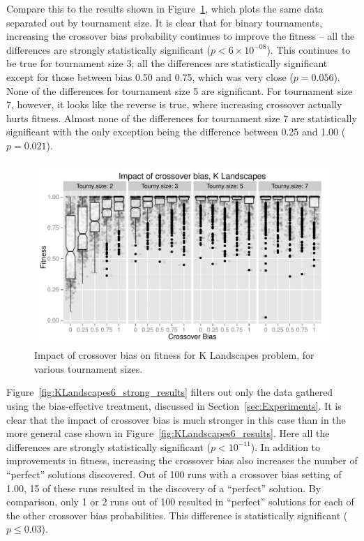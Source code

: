 \documentclass{sig-alternate}
\begin{document}
Compare this to the results shown in Figure~\ref{fig:KLandscapes6_XO_bias_impact_facets}, which plots the same data
separated out by tournament size. It is clear that for binary tournaments, increasing the crossover bias probability
continues to improve the fitness -- all the differences are strongly statistically significant ($p<6\times 10^{-08}$).
This continues to be true for tournament size 3; all the differences are statistically significant except for those
between bias 0.50 and 0.75, which was very close ($p=0.056$). None of the differences for tournament size 5 are
significant. For tournament size 7, however, it looks like the reverse is true, where increasing crossover actually
hurts fitness. Almost none of the differences for tournament size 7 are statistically significant with the only
exception being the difference between 0.25 and 1.00 ($p=0.021$).

\begin{figure}
\centering
\includegraphics[width=0.45 \textwidth]{Plots/KLandscapes6_XO_bias_impact_facets.pdf}
\caption{Impact of crossover bias on fitness for K Landscapes problem, for various tournament sizes.}
\label{fig:KLandscapes6_XO_bias_impact_facets}
\end{figure}

Figure~\ref{fig:KLandscapes6_strong_results} filters out only the data gathered using the bias-effective treatment,
discussed in Section~\ref{sec:Experiments}. It is clear that the impact of crossover bias is much stronger in this case
than in the more general case shown in Figure~\ref{fig:KLandscapes6_results}. Here all the differences are strongly
statistically significant ($p < 10^{-11}$). In addition to improvements in fitness, increasing the crossover bias also
increases the number of ``perfect'' solutions discovered. Out of 100 runs with a crossover bias setting of 1.00, 15 of
these runs resulted in the discovery of a ``perfect'' solution. By comparison, only 1 or 2 runs out of 100 resulted in
``perfect'' solutions for each of the other crossover bias probabilities. This difference is statistically significant
($p \leq 0.03$).
\end{document}

